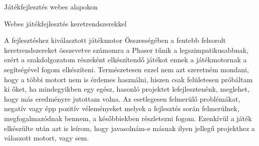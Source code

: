 \begin{MyChapter}{Játékfejlesztés webes alapokon}
\begin{MySection}{Webes játékfejlesztés keretrendszerekkel}
		\begin{MySubSection}{A fejlesztéshez kiválasztott játékmotor}		
			Összességében a fentebb felsorolt keretrendszereket összevetve számomra a Phaser tűnik a legszimpatikusabbnak, ezért a szakdolgozatom részeként elkészítendő játékot ennek a játékmotornak a segítségével fogom elkészíteni. Természetesen ezzel nem azt szeretném mondani, hogy a többi motort nem is érdemes használni, hiszen csak felületesen próbáltam ki őket, ha mindegyikben egy egész, hasonló projektet lefejlesztenénk, meglehet, hogy más eredményre jutottam volna.
			Az esetlegesen felmerülő problémákat, negatív vagy épp pozitív véleményeket melyek a fejlesztés során felmerülnek, megfogalmazódnak bennem, a későbbiekben részletezni fogom. Ezenkívül a játék elkészülte után azt is leírom, hogy javasolnám-e másnak ilyen jellegű projekthez a válaszott motort, vagy sem.
		\end{MySubSection}

	\end{MySection}
	
\end{MyChapter}